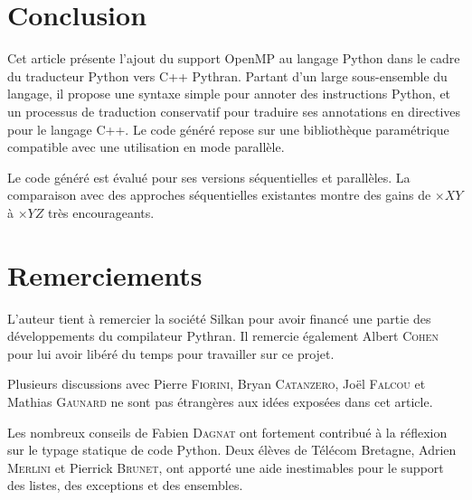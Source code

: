 \documentclass[renpar]{compas2013}
\begin{document}
\section{Conclusion}

Cet article présente l'ajout du support OpenMP au langage Python dans le
cadre du traducteur Python vers C++ Pythran. Partant d'un large
sous-ensemble du langage, il propose une syntaxe simple pour annoter des
instructions Python, et un processus de traduction conservatif pour
traduire ses annotations en directives pour le langage C++. Le code généré
repose sur une bibliothèque paramétrique compatible avec une utilisation
en mode parallèle.

Le code généré est évalué pour ses versions séquentielles et parallèles. La
comparaison avec des approches séquentielles existantes montre des gains
de $\times XY$ à $\times YZ$ très encourageants.



\section{Remerciements}

L'auteur tient à remercier la société Silkan pour avoir financé une partie des
développements du compilateur Pythran. Il remercie également Albert
\textsc{Cohen} pour lui avoir libéré du temps pour travailler sur ce projet.

Plusieurs discussions avec Pierre \textsc{Fiorini}, Bryan
\textsc{Catanzero}, Joël \textsc{Falcou} et Mathias \textsc{Gaunard} ne
sont pas étrangères aux idées exposées dans cet article.

Les nombreux conseils de Fabien \textsc{Dagnat} ont fortement contribué à
la réflexion sur le typage statique de code Python. Deux élèves de Télécom
Bretagne, Adrien \textsc{Merlini} et Pierrick \textsc{Brunet}, ont apporté
une aide inestimables pour le support des listes, des exceptions et des
ensembles.


\end{document}
